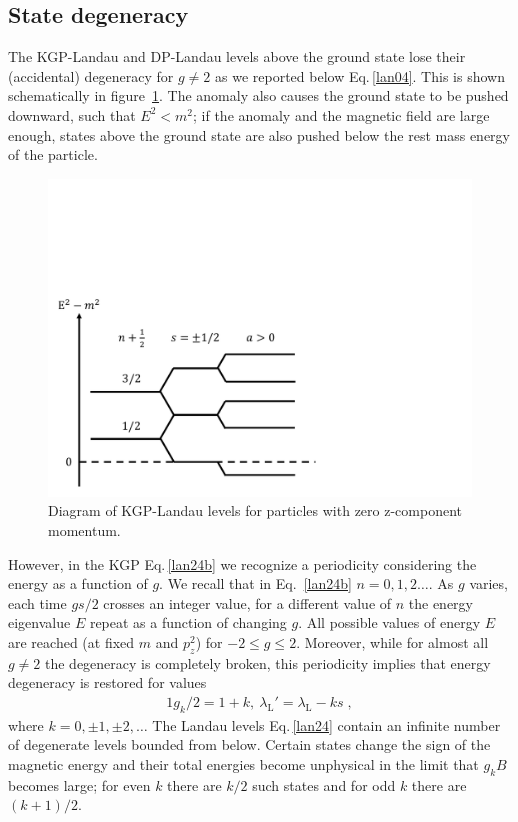\documentclass[epj]{svjour}
\begin{document}
\subsection{State degeneracy}\label{degener}
The KGP-Landau and DP-Landau levels above the ground state lose their (accidental) degeneracy for $g\neq 2$ as we reported below Eq.\,\eqref{lan04}. This is shown schematically in figure~\ref{f04}. The anomaly also causes the ground state to be pushed downward, such that $E^{2}<m^{2}$; if the anomaly and the magnetic field are large enough, states above the ground state are also pushed below the rest mass energy of the particle.

\begin{figure}
 \centering
 \includegraphics[clip, trim=0.0cm 0.0cm 9.0cm 7.0cm,width=\linewidth]{lanplot04}
 \caption[]{Diagram of KGP-Landau levels for particles with zero z-component momentum.}
 \label{f04}
\end{figure}

However, in the KGP Eq.\,\eqref{lan24b} we recognize a periodicity considering the energy as a function of $g$. We recall that in Eq.~\eqref{lan24b} $n=0, 1, 2\ldots$. As $g$ varies, each time $gs/2$ crosses an integer value, for a different value of $n$ the energy eigenvalue $E$ repeat as a function of changing $g$. All possible values of energy $E$ are reached (at fixed $m$ and $p^2_z$) for $-2\le g\le 2$. Moreover, while for almost all $g\ne 2$ the degeneracy is completely broken, this periodicity implies that energy degeneracy is restored for values~\cite{Rafelski:2012ui} 
\begin{alignat}{1}
\label{lan26} g_{k}/2=1+k,\ \lambda_\mathrm{L}'=\lambda_\mathrm{L}-ks\;,
\end{alignat}
where $k=0,\pm1,\pm2,\ldots$ The Landau levels Eq.\,\eqref{lan24} contain an infinite number of degenerate levels bounded from below. Certain states change the sign of the magnetic energy and their total energies become unphysical in the limit that $g_{k}B$ becomes large; for even $k$ there are $k/2$ such states and for odd $k$ there are $(k+1)/2$. 
\end{document}
